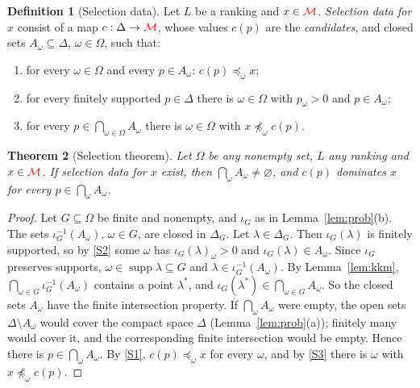 \documentclass[11pt]{article}
\newcommand{\chg}[1]{{\color{red}#1}}
\newtheorem{theorem}{Theorem}[section]
\theoremstyle{definition}
\newtheorem{definition}[theorem]{Definition}
\theoremstyle{remark}
\newcommand{\M}{\mathcal M}
\newcommand{\supp}{\operatorname{supp}}
\begin{document}
\begin{definition}[Selection data]\label{def:selection-data}
Let $L$ be a ranking and $x\in\chg{\M}$. \emph{Selection data for $x$} consist of a map $c:\Delta\to\chg{\M}$, whose values $c(p)$ are the \emph{candidates}, and closed sets $A_\omega\subseteq\Delta$, $\omega\in\Omega$, such that:
\begin{enumerate}[label=(S\arabic*),leftmargin=3em]
\item\label{S1} for every $\omega\in\Omega$ and every $p\in A_\omega$: $c(p)\preceq_\omega x$;
\item\label{S2} for every finitely supported $p\in\Delta$ there is $\omega\in\Omega$ with $p_\omega>0$ and $p\in A_\omega$;
\item\label{S3} for every $p\in\bigcap_{\omega\in\Omega}A_\omega$ there is $\omega\in\Omega$ with $x\not\preceq_\omega c(p)$.
\end{enumerate}
\end{definition}

\begin{theorem}[Selection theorem]\label{thm:selection}
Let $\Omega$ be any nonempty set, $L$ any ranking and $x\in\chg{\M}$. If selection data for $x$ exist, then $\bigcap_\omega A_\omega\ne\varnothing$, and $c(p)$ dominates $x$ for every $p\in\bigcap_\omega A_\omega$.
\end{theorem}
\begin{proof}
Let $G\subseteq\Omega$ be finite and nonempty, and $\iota_G$ as in Lemma~\ref{lem:prob}(b). The sets $\iota_G^{-1}(A_\omega)$, $\omega\in G$, are closed in $\Delta_G$. Let $\lambda\in\Delta_G$. Then $\iota_G(\lambda)$ is finitely supported, so by \ref{S2} some $\omega$ has $\iota_G(\lambda)_\omega>0$ and $\iota_G(\lambda)\in A_\omega$. Since $\iota_G$ preserves supports, $\omega\in\supp\lambda\subseteq G$ and $\lambda\in\iota_G^{-1}(A_\omega)$. By Lemma~\ref{lem:kkm}, $\bigcap_{\omega\in G}\iota_G^{-1}(A_\omega)$ contains a point $\lambda^*$, and $\iota_G(\lambda^*)\in\bigcap_{\omega\in G}A_\omega$. So the closed sets $A_\omega$ have the finite intersection property. If $\bigcap_\omega A_\omega$ were empty, the open sets $\Delta\setminus A_\omega$ would cover the compact space $\Delta$ (Lemma~\ref{lem:prob}(a)); finitely many would cover it, and the corresponding finite intersection would be empty. Hence there is $p\in\bigcap_\omega A_\omega$. By \ref{S1}, $c(p)\preceq_\omega x$ for every $\omega$, and by \ref{S3} there is $\omega$ with $x\not\preceq_\omega c(p)$.
\end{proof}
\end{document}
